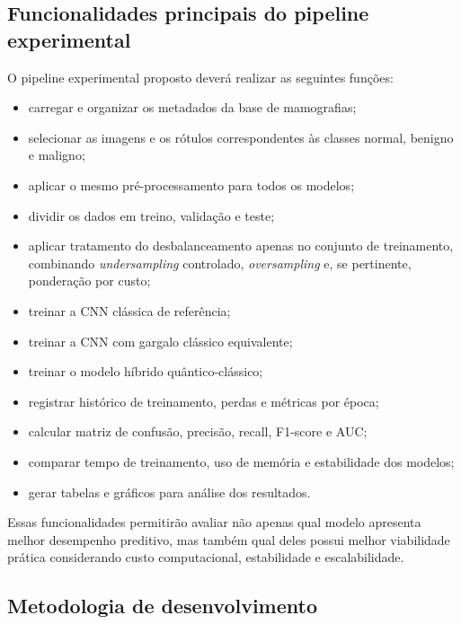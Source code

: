 \documentclass[
    12pt,
    openright,
    oneside,
    a4paper,
    english,
    brazil
]{abntex2}
\begin{document}
\subsection{Funcionalidades principais do pipeline experimental}
\label{subsec:funcionalidades}

O pipeline experimental proposto deverá realizar as seguintes funções:

\begin{itemize}
    \item carregar e organizar os metadados da base de mamografias;
    \item selecionar as imagens e os rótulos correspondentes às classes normal, benigno e maligno;
    \item aplicar o mesmo pré-processamento para todos os modelos;
    \item dividir os dados em treino, validação e teste;
    \item aplicar tratamento do desbalanceamento apenas no conjunto de treinamento, combinando \textit{undersampling} controlado, \textit{oversampling} e, se pertinente, ponderação por custo;
    \item treinar a CNN clássica de referência;
    \item treinar a CNN com gargalo clássico equivalente;
    \item treinar o modelo híbrido quântico-clássico;
    \item registrar histórico de treinamento, perdas e métricas por época;
    \item calcular matriz de confusão, precisão, recall, F1-score e AUC;
    \item comparar tempo de treinamento, uso de memória e estabilidade dos modelos;
    \item gerar tabelas e gráficos para análise dos resultados.
\end{itemize}

Essas funcionalidades permitirão avaliar não apenas qual modelo apresenta melhor desempenho preditivo, mas também qual deles possui melhor viabilidade prática considerando custo computacional, estabilidade e escalabilidade.

\subsection{Metodologia de desenvolvimento}
\label{subsec:metodologia_desenvolvimento}
\end{document}

